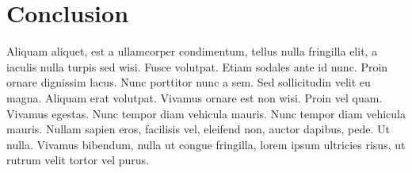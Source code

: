 \documentclass[11pt]{article}
\begin{document}
\section{Conclusion}
\label{sec:conclusion}
\vspace{-0.2in}
%
Aliquam aliquet, est a ullamcorper condimentum, tellus nulla fringilla elit, a iaculis nulla turpis sed wisi. Fusce volutpat. Etiam sodales ante id nunc. Proin ornare dignissim lacus. Nunc porttitor nunc a sem. Sed sollicitudin velit eu magna. Aliquam erat volutpat. Vivamus ornare est non wisi. Proin vel quam. Vivamus egestas. Nunc tempor diam vehicula mauris. Nunc tempor diam vehicula mauris. Nullam sapien eros, facilisis vel, eleifend non, auctor dapibus, pede. Ut nulla. Vivamus bibendum, nulla ut congue fringilla, lorem ipsum ultricies risus, ut rutrum velit tortor vel purus.
\end{document}
